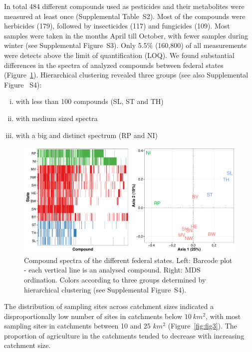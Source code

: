 \documentclass[journal=esthag,manuscript=article]{achemso}
\begin{document}
In total 484 different compounds used as pesticides and their metabolites were measured at least once (Supplemental Table~S2). 
Most of the compounds were herbicides (179), followed by insecticides (117) and fungicides (109).
Most samples were taken in the months April till October, with fewer samples during winter (see Supplemental Figure~S3).
Only 5.5\% (160,800) of all measurements were detects above the limit of quantification (LOQ).
We found substantial differences in the spectra of analyzed compounds between federal states (Figure~\ref{fig:fig2}).
Hierarchical clustering revealed three groups (see also Supplemental Figure~ S4):

\begin{enumerate}[i)]
	\item with less than 100 compounds (SL, ST and TH)
	\item with medium sized spectra
	\item with a big and distinct spectrum (RP and NI)
\end{enumerate}
\begin{figure}[ht]
  \includegraphics[width=\textwidth]{figure2.pdf}
  \caption{Compound spectra of the different federal states. Left: Barcode plot - each vertical line is an analysed compound. Right: MDS ordination. 
  Colors according to three groups determined by hierarchical clustering (see Supplemental Figure~S4).}
  \label{fig:fig2}
\end{figure}

The distribution of sampling sites across catchment sizes indicated a disproportionally low number of sites in catchments below $10~km^2$, with most sampling sites in catchments between 10 and 25 $km^2$ (Figure~\ref{fig:fig3}).
The proportion of agriculture in the catchments tended to decrease with increasing catchment size.
\end{document}
